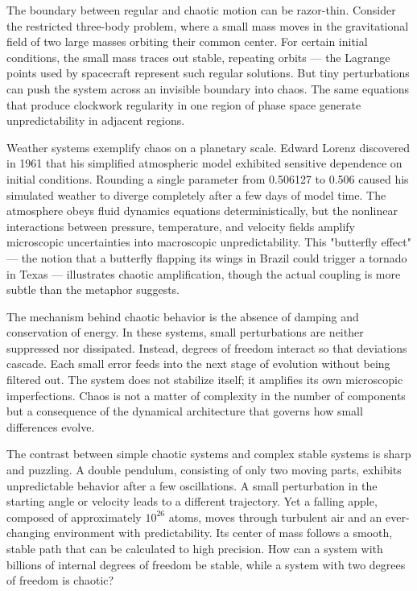 The boundary between regular and chaotic motion can be razor-thin. Consider the restricted three-body problem, where a small mass moves in the gravitational field of two large masses orbiting their common center. For certain initial conditions, the small mass traces out stable, repeating orbits — the Lagrange points used by spacecraft represent such regular solutions. But tiny perturbations can push the system across an invisible boundary into chaos. The same equations that produce clockwork regularity in one region of phase space generate unpredictability in adjacent regions.

Weather systems exemplify chaos on a planetary scale. Edward Lorenz discovered in 1961 that his simplified atmospheric model exhibited sensitive dependence on initial conditions. Rounding a single parameter from 0.506127 to 0.506 caused his simulated weather to diverge completely after a few days of model time. The atmosphere obeys fluid dynamics equations deterministically, but the nonlinear interactions between pressure, temperature, and velocity fields amplify microscopic uncertainties into macroscopic unpredictability. This "butterfly effect" — the notion that a butterfly flapping its wings in Brazil could trigger a tornado in Texas — illustrates chaotic amplification, though the actual coupling is more subtle than the metaphor suggests.

The mechanism behind chaotic behavior is the absence of damping and conservation of energy. In these systems, small perturbations are neither suppressed nor dissipated. Instead, degrees of freedom interact so that deviations cascade. Each small error feeds into the next stage of evolution without being filtered out. The system does not stabilize itself; it amplifies its own microscopic imperfections. Chaos is not a matter of complexity in the number of components but a consequence of the dynamical architecture that governs how small differences evolve.


The contrast between simple chaotic systems and complex stable systems is sharp and puzzling. A double pendulum, consisting of only two moving parts, exhibits unpredictable behavior after a few oscillations. A small perturbation in the starting angle or velocity leads to a different trajectory. Yet a falling apple, composed of approximately $10^{26}$ atoms, moves through turbulent air and an ever-changing environment with predictability. Its center of mass follows a smooth, stable path that can be calculated to high precision. How can a system with billions of internal degrees of freedom be stable, while a system with two degrees of freedom is chaotic?

